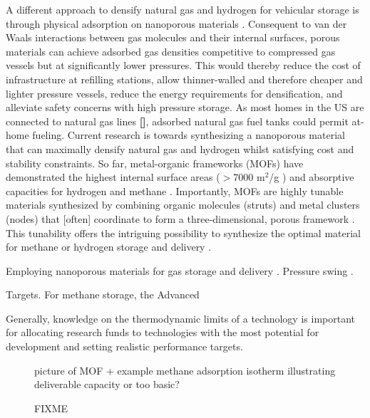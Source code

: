 \documentclass{nature}
\newcommand{\addcite}{{\bf \color{red} []}}
\begin{document}
A different approach to densify natural gas and hydrogen for vehicular storage is through physical adsorption on nanoporous materials \cite{schoedel2016role}. Consequent to van der Waals interactions between gas molecules and their internal surfaces, porous materials can achieve adsorbed gas densities competitive to compressed gas vessels but at significantly lower pressures. This would thereby reduce the cost of infrastructure at refilling stations, allow thinner-walled and therefore cheaper and lighter pressure vessels, reduce the energy requirements for densification, and alleviate safety concerns with high pressure storage. As most homes in the US are connected to natural gas lines \addcite, adsorbed natural gas fuel tanks could permit at-home fueling. Current research is towards synthesizing a nanoporous material that can maximally densify natural gas and hydrogen whilst satisfying cost and stability constraints. So far, metal-organic frameworks (MOFs) \cite{furukawa2013chemistry} have demonstrated the highest internal surface areas ($>$7000 m$^2$/g \cite{farha2012metal}) and absorptive capacities for hydrogen \cite{suh2011hydrogen,garcia2018benchmark} and methane \cite{makal2012methane,mason2014evaluating}. Importantly, MOFs are highly tunable materials synthesized by combining organic molecules (struts) and metal clusters (nodes) that [often] coordinate to form a three-dimensional, porous framework \cite{furukawa2013chemistry}. This tunability offers the intriguing possibility to synthesize the optimal material for methane or hydrogen storage and delivery \cite{schoedel2016role}.


Employing nanoporous materials for gas storage and delivery \cite{schoedel2016role}. Pressure swing \cite{sircar2002pressure}.

Targets.
For methane storage, the Advanced \cite{arpaemove}

Generally, knowledge on the thermodynamic limits of a technology is important for allocating research funds to technologies with the most potential for development and setting realistic performance targets.

\begin{figure}
    \centering
    picture of MOF + example methane adsorption isotherm illustrating deliverable capacity or too basic?
    \caption{FIXME}
    \label{fig:example-experiment}
\end{figure}
\end{document}
